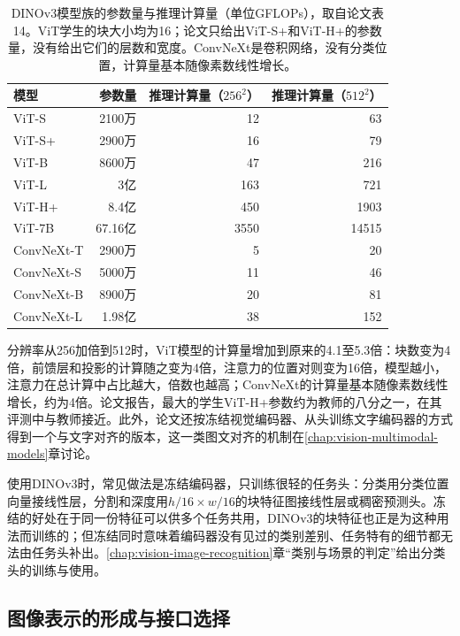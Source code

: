 \begin{table}[tbp]
  \centering
  \small
  \begin{tabular}{@{}lrrr@{}}
    \toprule
    模型 & 参数量 & 推理计算量（$256^2$） & 推理计算量（$512^2$）\\
    \midrule
    ViT-S & 2100万 & 12 & 63\\
    ViT-S+ & 2900万 & 16 & 79\\
    ViT-B & 8600万 & 47 & 216\\
    ViT-L & 3亿 & 163 & 721\\
    ViT-H+ & 8.4亿 & 450 & 1903\\
    ViT-7B & 67.16亿 & 3550 & 14515\\
    ConvNeXt-T & 2900万 & 5 & 20\\
    ConvNeXt-S & 5000万 & 11 & 46\\
    ConvNeXt-B & 8900万 & 20 & 81\\
    ConvNeXt-L & 1.98亿 & 38 & 152\\
    \bottomrule
  \end{tabular}
  \caption{DINOv3模型族的参数量与推理计算量（单位GFLOPs），取自论文表14。ViT学生的块大小均为16；论文只给出ViT-S+和ViT-H+的参数量，没有给出它们的层数和宽度。ConvNeXt是卷积网络，没有分类位置，计算量基本随像素数线性增长。}
  \label{tab:vision-ivm-dinov3-family}
\end{table}

分辨率从256加倍到512时，ViT模型的计算量增加到原来的4.1至5.3倍：块数变为4倍，前馈层和投影的计算随之变为4倍，注意力的位置对则变为16倍，模型越小，注意力在总计算中占比越大，倍数也越高；ConvNeXt的计算量基本随像素数线性增长，约为4倍。论文报告，最大的学生ViT-H+参数约为教师的八分之一，在其评测中与教师接近。此外，论文还按冻结视觉编码器、从头训练文字编码器的方式得到一个与文字对齐的版本，这一类图文对齐的机制在\ref{chap:vision-multimodal-models}章讨论。

使用DINOv3时，常见做法是冻结编码器，只训练很轻的任务头：分类用分类位置向量接线性层，分割和深度用$h/16\times w/16$的块特征图接线性层或稠密预测头。冻结的好处在于同一份特征可以供多个任务共用，DINOv3的块特征也正是为这种用法而训练的；但冻结同时意味着编码器没有见过的类别差别、任务特有的细节都无法由任务头补出。\ref{chap:vision-image-recognition}章“类别与场景的判定”给出分类头的训练与使用。

\subsection{图像表示的形成与接口选择}
\label{sec:vision-ivm-image-interface}


